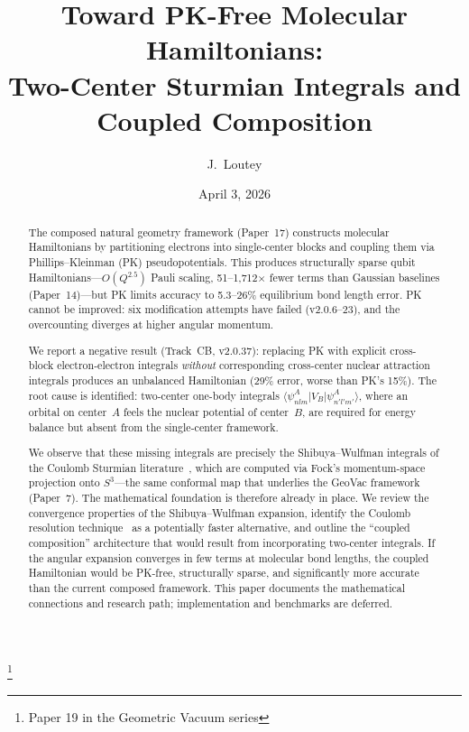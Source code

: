 \documentclass[aps,pra,twocolumn,superscriptaddress,longbibliography]{revtex4-2}
\begin{document}
\title{Toward PK-Free Molecular Hamiltonians:\\
Two-Center Sturmian Integrals and Coupled Composition}
\thanks{Paper 19 in the Geometric Vacuum series}

\author{J.~Loutey}

\date{April 3, 2026}


\begin{abstract}
The composed natural geometry framework (Paper~17) constructs
molecular Hamiltonians by partitioning electrons into single-center
blocks and coupling them via Phillips--Kleinman (PK) pseudopotentials.
This produces structurally sparse qubit Hamiltonians---$O(Q^{2.5})$
Pauli scaling, 51--1{,}712$\times$ fewer terms than Gaussian
baselines (Paper~14)---but PK limits accuracy to 5.3--26\%
equilibrium bond length error.  PK cannot be improved: six
modification attempts have failed (v2.0.6--23), and the overcounting
diverges at higher angular momentum.

We report a negative result (Track~CB, v2.0.37): replacing PK with
explicit cross-block electron-electron integrals \emph{without}
corresponding cross-center nuclear attraction integrals produces an
unbalanced Hamiltonian (29\% error, worse than PK's 15\%).  The root
cause is identified: two-center one-body integrals
$\langle \psi_{nlm}^A | V_B | \psi_{n'l'm'}^A \rangle$, where an
orbital on center~$A$ feels the nuclear potential of center~$B$, are
required for energy balance but absent from the single-center
framework.

We observe that these missing integrals are precisely the
Shibuya--Wulfman integrals of the Coulomb Sturmian
literature~\cite{shibuya1965,avery2004,avery2012}, which are computed
via Fock's momentum-space projection onto $S^3$---the same conformal
map that underlies the GeoVac framework (Paper~7).  The mathematical
foundation is therefore already in place.  We review the convergence
properties of the Shibuya--Wulfman expansion, identify the Coulomb
resolution technique~\cite{hoggan2011} as a potentially faster
alternative, and outline the ``coupled composition'' architecture
that would result from incorporating two-center integrals.  If the
angular expansion converges in few terms at molecular bond lengths,
the coupled Hamiltonian would be PK-free, structurally sparse, and
significantly more accurate than the current composed framework.
This paper documents the mathematical connections and research path;
implementation and benchmarks are deferred.
\end{abstract}
\end{document}
